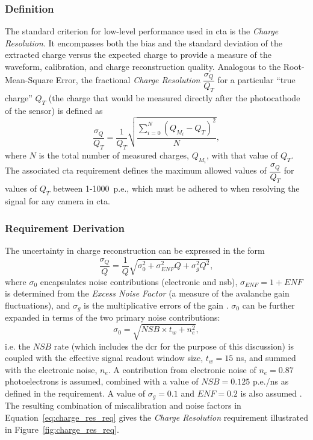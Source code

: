\subsubsection{Definition}
The standard criterion for low-level performance used in \gls{cta} is the \textit{Charge Resolution}. It encompasses both the bias and the standard deviation of the extracted charge versus the expected charge to provide a measure of the waveform, calibration, and charge reconstruction quality. Analogous to the Root-Mean-Square Error, the fractional \textit{Charge Resolution} $\dfrac{\sigma_Q}{Q_T}$ for a particular ``true charge'' $Q_T$ (the charge that would be measured directly after the photocathode of the sensor) is defined as
\begin{equation} \label{eq:charge_res}
\dfrac{\sigma_Q}{Q_T} = \dfrac{1}{Q_T} \sqrt{\dfrac{\sum_{i=0}^N (Q_{M_i} - Q_T)^2}{N}},
\end{equation}
where $N$ is the total number of measured charges, $Q_{M_i}$, with that value of $Q_T$. The associated \gls{cta} requirement defines the maximum allowed values of $\dfrac{\sigma_Q}{Q_T}$ for values of $Q_T$ between 1-1000~p.e., which must be adhered to when resolving the signal for any camera in \gls{cta}.

\subsubsection{Requirement Derivation}
The uncertainty in charge reconstruction can be expressed in the form
\begin{equation} \label{eq:charge_res_req}
\dfrac{\sigma_Q}{Q} = \dfrac{1}{Q} \sqrt{\sigma_0^2 + \sigma_{ENF}^2 Q + \sigma_g^2 Q^2},
\end{equation}
where $\sigma_0$ encapsulates noise contributions (electronic and \gls{nsb}), $\sigma_{ENF} = 1 + \mathit{ENF}$ is determined from the \textit{Excess Noise Factor} (a measure of the avalanche gain fluctuations), and $\sigma_g$ is the multiplicative errors of the gain \cite{petophotons}\cite{Ohm2012}. $\sigma_0$ can be further expanded in terms of the two primary noise contributions:
\begin{equation} \label{eq:charge_res_nsb}
\sigma_0 = \sqrt{\mathit{NSB} \times t_w + n_e^2},
\end{equation}
i.e. the $\mathit{NSB}$ rate (which includes the \gls{dcr} for the purpose of this discussion) is coupled with the effective signal readout window size, $t_w = 15$ ns, and summed with the electronic noise, $n_e$. A contribution from electronic noise of $n_e = 0.87$ photoelectrons is assumed, combined with a value of $\mathit{NSB} = 0.125$ p.e./ns as defined in the requirement. A value of $\sigma_g = 0.1$ and $\mathit{ENF} = 0.2$ is also assumed \cite{petophotons}. The resulting combination of miscalibration and noise factors in Equation~\ref{eq:charge_res_req} gives the \textit{Charge Resolution} requirement illustrated in Figure~\ref{fig:charge_res_req}.


